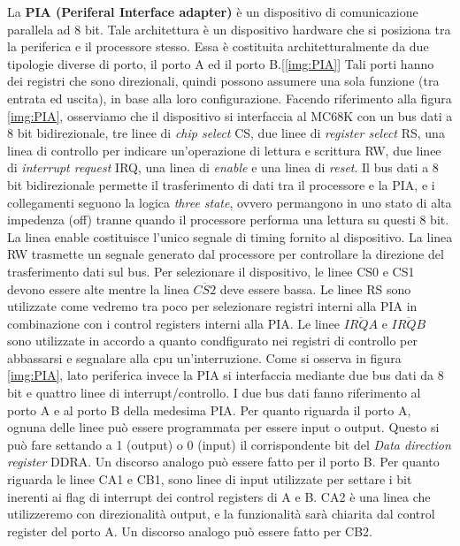 La \textbf{PIA (Periferal Interface adapter)} è un dispositivo di comunicazione parallela ad 8 bit. Tale architettura è un dispositivo hardware che si posiziona tra la periferica e il processore stesso. Essa è costituita architetturalmente da due tipologie diverse di porto, il porto A ed il porto B.[\ref{img:PIA}]
Tali porti hanno dei registri che sono direzionali, quindi possono assumere una sola funzione (tra entrata ed uscita), in base alla loro configurazione.
Facendo riferimento alla figura \ref{img:PIA}, osserviamo che il dispositivo si interfaccia al MC68K con un bus dati a 8 bit bidirezionale, tre linee di \textit{chip select} CS, due linee di \textit{register select} RS, una linea di controllo per indicare un'operazione di lettura e scrittura RW, due linee di \textit{interrupt request} IRQ, una linea di \textit{enable} e una linea di \textit{reset}. 
Il bus dati a 8 bit bidirezionale permette il trasferimento di dati tra il processore e la PIA, e i collegamenti seguono la logica \textit{three state}, ovvero permangono in uno stato di alta impedenza (off) tranne quando il processore performa una lettura su questi 8 bit. 
La linea enable costituisce l'unico segnale di timing fornito al dispositivo. La linea RW trasmette un segnale generato dal processore per controllare la direzione del trasferimento dati sul bus. Per selezionare il dispositivo, le linee CS0 e CS1 devono essere alte mentre la linea $\overline{CS2}$ deve essere bassa.
Le linee RS sono utilizzate come vedremo tra poco per selezionare registri interni alla PIA in combinazione con i control registers interni alla PIA. Le linee $\overline{IRQA}$ e $\overline{IRQB}$ sono utilizzate in accordo a quanto condfigurato nei registri di controllo per abbassarsi e segnalare alla cpu un'interruzione.
Come si osserva in figura \ref{img:PIA}, lato periferica invece la PIA si interfaccia mediante due bus dati da 8 bit e quattro linee di interrupt/controllo. I due bus dati fanno riferimento al porto A e al porto B della medesima PIA. Per quanto riguarda il porto A, ognuna delle linee può essere programmata per essere input o output. Questo si può fare settando a 1 (output) o 0 (input) il corrispondente bit del \textit{Data direction register} DDRA. Un discorso analogo può essere fatto per il porto B.
Per quanto riguarda le linee CA1 e CB1, sono linee di input utilizzate per settare i bit inerenti ai flag di interrupt dei control registers di A e B. CA2 è una linea che utilizzeremo con direzionalità output, e la funzionalità sarà chiarita dal control register del porto A. Un discorso analogo può essere fatto per CB2.

